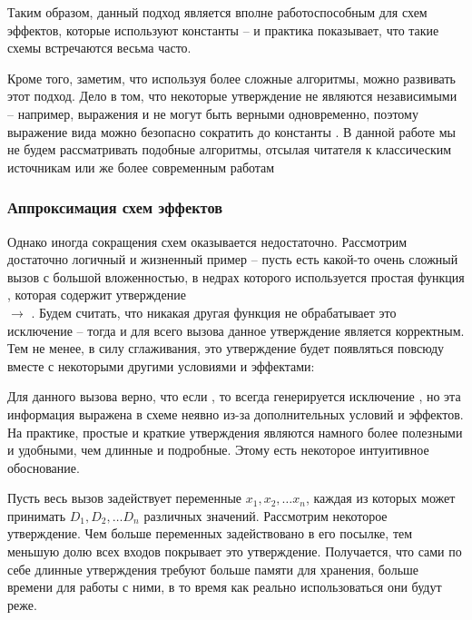 Таким образом, данный подход является вполне работоспособным для схем эффектов, которые используют константы -- и практика показывает, что такие схемы встречаются весьма часто.

Кроме того, заметим, что используя более сложные алгоритмы, можно развивать этот подход. Дело в том, что некоторые утверждение не являются независимыми -- например, выражения  и  не могут быть верными одновременно, поэтому выражение вида  можно безопасно сократить до константы . В данной работе мы не будем рассматривать подобные алгоритмы, отсылая читателя к классическим источникам \cite{McCluskey56} или же более современным работам \cite{Jain08}


\subsubsection{Аппроксимация схем эффектов}

Однако иногда сокращения схем оказывается недостаточно. Рассмотрим достаточно логичный и жизненный пример -- пусть есть какой-то очень сложный вызов с большой вложенностью, в недрах которого используется простая функция , которая содержит утверждение \\  $\rightarrow$ . Будем считать, что никакая другая функция не обрабатывает это исключение -- тогда и для всего вызова данное утверждение является корректным. Тем не менее, в силу сглаживания, это утверждение будет появляться повсюду вместе с некоторыми другими условиями и эффектами:

{}

Для данного вызова верно, что если , то всегда генерируется исключение , но эта информация выражена в схеме неявно из-за дополнительных условий и эффектов. На практике, простые и краткие утверждения являются намного более полезными и удобными, чем длинные и подробные. Этому есть некоторое интуитивное обоснование. 

Пусть весь вызов задействует переменные $x_1, x_2, \ldots x_n$, каждая из которых может принимать $D_1, D_2, \ldots D_n$ различных значений. Рассмотрим некоторое утверждение. Чем больше переменных задействовано в его посылке, тем меньшую долю всех входов покрывает это утверждение. Получается, что сами по себе длинные утверждения требуют больше памяти для хранения, больше времени для работы с ними, в то время как реально использоваться они будут реже. 


